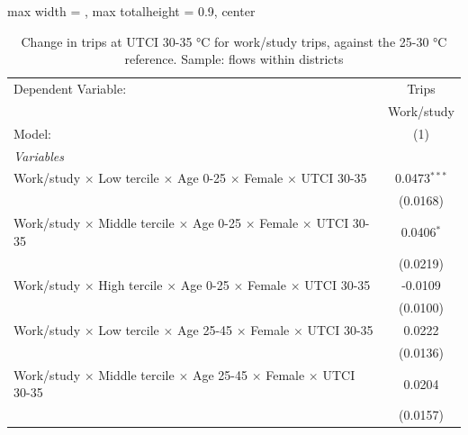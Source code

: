 
\begin{table}[htbp]
   \caption{\label{table_intersectionality_work_or_study_30-35} Change in trips at UTCI 30-35 °C for work/study trips, against the 25-30 °C reference. Sample: flows within districts}
   \centering
   \small
   \begin{adjustbox}{max width = \textwidth, max totalheight = 0.9\textheight, center}
      \begin{tabular}{lc}
         \tabularnewline \midrule \midrule
         Dependent Variable:                                                                            & Trips\\  
                                                                                                        & Work/study \\   
         Model:                                                                                         & (1)\\  
         \midrule
         \emph{Variables}\\
         Work/study $\times$ Low tercile $\times$ Age 0-25 $\times$ Female $\times$ UTCI 30-35          & 0.0473$^{***}$\\   
                                                                                                        & (0.0168)\\   
         Work/study $\times$ Middle tercile $\times$ Age 0-25 $\times$ Female $\times$ UTCI 30-35       & 0.0406$^{*}$\\   
                                                                                                        & (0.0219)\\   
         Work/study $\times$ High tercile $\times$ Age 0-25 $\times$ Female $\times$ UTCI 30-35         & -0.0109\\   
                                                                                                        & (0.0100)\\   
         Work/study $\times$ Low tercile $\times$ Age 25-45 $\times$ Female $\times$ UTCI 30-35         & 0.0222\\   
                                                                                                        & (0.0136)\\   
         Work/study $\times$ Middle tercile $\times$ Age 25-45 $\times$ Female $\times$ UTCI 30-35      & 0.0204\\   
                                                                                                        & (0.0157)\\   

\end{tabular}
\end{adjustbox}
\end{table}
